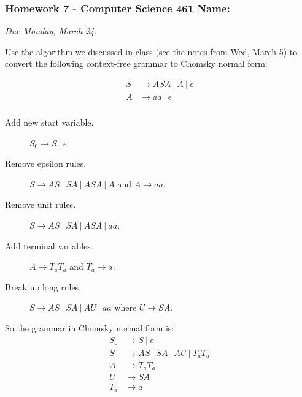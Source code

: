 \documentclass[12pt,answers]{exam}
\begin{document}
\pagestyle{empty}
\subsubsection*{Homework 7 - Computer Science 461 \hfill Name: \underline{\hspace*{2in}}}

\textit{Due Monday, March 24.} %

\begin{questions}

\question Use the algorithm we discussed in class (see the notes from Wed, March 5) to convert the following context-free grammar to Chomsky normal form:

\begin{minipage}{1.5in}
\begin{align*}
S &\rightarrow ASA ~|~ A ~|~ \epsilon \\
A &\rightarrow aa ~|~ \epsilon \\
\end{align*}
\end{minipage}

\begin{solution}
\begin{description}
\item[Add new start variable.] $S_0 \rightarrow S ~|~ \epsilon$.
\item[Remove epsilon rules.] $S \rightarrow AS ~|~ SA ~|~ASA  ~|~ A$ and $A \rightarrow aa$. 
\item[Remove unit rules.] $S \rightarrow AS ~|~ SA ~|~ASA  ~|~ aa$. 
\item[Add terminal variables.] $A \rightarrow T_a T_a$ and $T_a \rightarrow a$.
\item[Break up long rules.] $S \rightarrow AS ~|~ SA ~|~ AU ~|~ aa$ where $U \rightarrow SA$. 
\end{description} 

So the grammar in Chomsky normal form is:
\begin{align*}
S_0 &\rightarrow S ~|~ \epsilon \\
S &\rightarrow AS ~|~ SA ~|~ AU ~|~ T_a T_a\\
A &\rightarrow T_a T_a \\
U &\rightarrow SA \\
T_a &\rightarrow a 
\end{align*}


\end{solution}
\end{questions}
\end{document}
